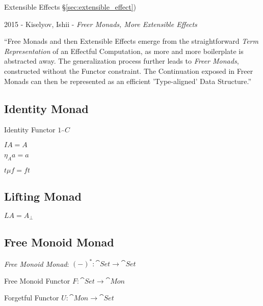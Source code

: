Extensible Effects \S\ref{sec:extensible_effect})

2015 - Kiselyov, Ishii - \emph{Freer Monads, More Extensible Effects}

``Free Monads and then Extensible Effects emerge from the straightforward
\emph{Term Representation} of an Effectful Computation, as more and more
boilerplate is abstracted away. The generalization process further leads to
\emph{Freer Monads}, constructed without the Functor constraint. The
Continuation exposed in Freer Monads can then be represented as an efficient
'Type-aligned' Data Structure.''



\subsection{Identity Monad}\label{sec:identity_monad}

Identity Functor $1_\cat{C}$

$I A = A$

$\eta_A a = a$

$t \mu f = f t$



\subsection{Lifting Monad}\label{sec:lifting_monad}

$L A = A_\bot$




\subsection{Free Monoid Monad}\label{sec:free_monoid_monad}

\emph{Free Monoid Monad}: $(-)^* : \cat{Set} \rightarrow \cat{Set}$

Free Monoid Functor $F : \cat{Set} \rightarrow \cat{Mon}$

Forgetful Functor $U : \cat{Mon} \rightarrow \cat{Set}$

